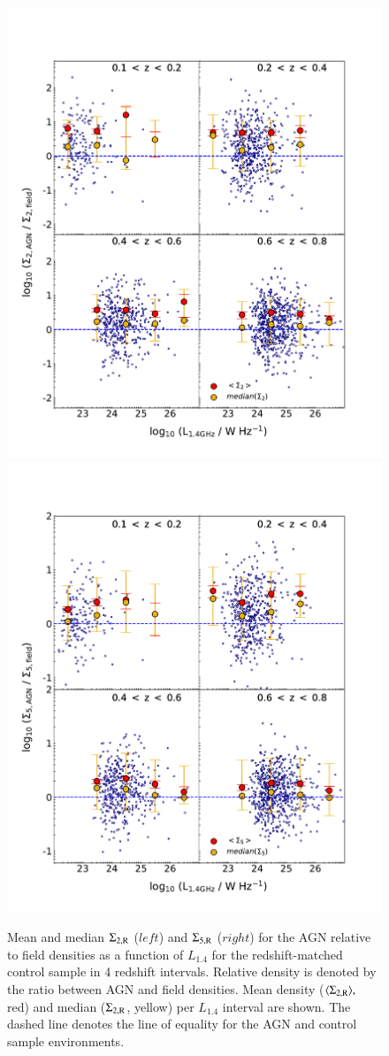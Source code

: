\begin{figure}
\hspace*{-50pt}
  \includegraphics[width=0.6\columnwidth]{plots_chp2/env_L_radio_binned_errs_2_random_control.pdf}
\includegraphics[width=0.6\columnwidth]{plots_chp2/env_L_radio_binned_errs_5_random_control.pdf}
  \caption[Sample (i): Mean and median surface densities, $\Sigma_{2,\rm{R}}$ and $\Sigma_{5,\rm{R}},$ in $L_{1.4}$ bins.]{Mean and median $\Sigma_{2,\rm{R}}$ ($left$) and $\Sigma_{5,\rm{R}}$ ($right$) for the AGN relative to field densities as a function of $L_{1.4}$ for the redshift-matched control sample in 4 redshift intervals. Relative density is denoted by the ratio between AGN and field densities. Mean density ($\langle \Sigma_{2,\rm{R}} \rangle,$ red) and median ($\Sigma_{2,\rm{R}}$, yellow) per $L_{1.4}$ interval are shown. The dashed line denotes the line of equality for the AGN and control sample environments.}
  \label{fig:random-env_L-radio}
\end{figure}

